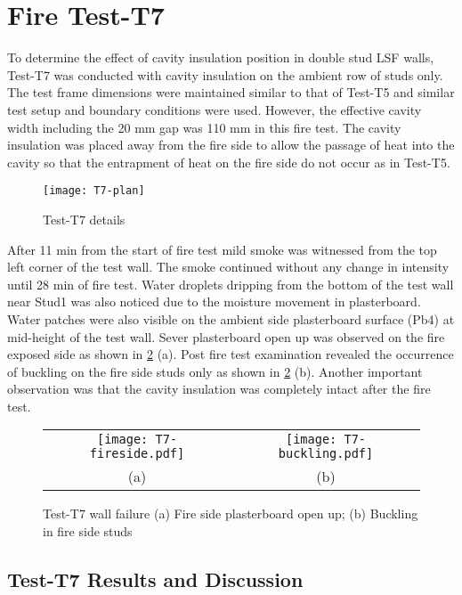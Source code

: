 \section{Fire Test-T7}

To determine the effect of cavity insulation position in double stud LSF walls, Test-T7 was conducted with cavity insulation on the ambient row of studs only. The test frame dimensions were maintained similar to that of Test-T5 and similar test setup and boundary conditions were used. However, the effective cavity width including the 20 mm gap was 110 mm in this fire test. The cavity insulation was placed away from the fire side to allow the passage of heat into the cavity so that the entrapment of heat on the fire side do not occur as in Test-T5. 
\begin{figure}[!htbp]
	\centering
		\texttt{[image: T7-plan]}
		\caption{Test-T7 details}
		\label{fig:T7-plan}
\end{figure}

After 11 min from the start of fire test mild smoke was witnessed from the top left corner of the test wall. The smoke continued without any change in  intensity until 28 min of fire test. Water droplets dripping from the bottom of the test wall near Stud1 was also noticed due to the moisture movement in plasterboard. Water patches were also visible on the ambient side plasterboard surface (Pb4) at mid-height of the test wall. Sever plasterboard open up was observed on the fire exposed side as shown in \cref{fig:T7-failure} (a). Post fire test examination revealed the occurrence of buckling on the fire side studs only as shown in \cref{fig:T7-failure} (b). Another important observation was that the cavity insulation was completely intact after the fire test. 
\begin{figure}[!htbp]
	\centering	
		\begin{tabular}{cc}
			\texttt{[image: T7-fireside.pdf]} & \texttt{[image: T7-buckling.pdf]} \\
			(a) & (b) \\
			\end{tabular}
		\caption{Test-T7 wall failure (a) Fire side plasterboard open up; (b) Buckling in fire side studs}
		\label{fig:T7-failure}
\end{figure}

\subsection{Test-T7 Results and Discussion}

